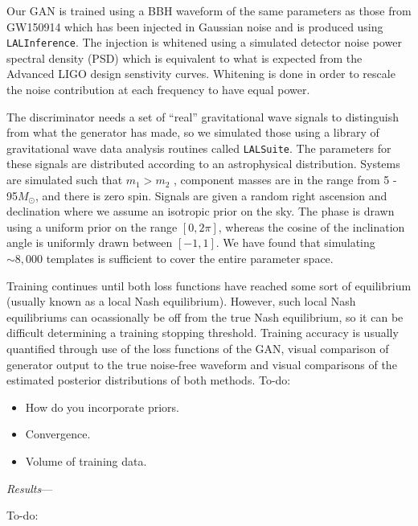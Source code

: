 \documentclass[%
showpacs,
 amsmath,amssymb,
 aps,
 twocolumn,
 prl,
 reprint,
floatfix,
]{revtex4-1}
\begin{document}
Our GAN is trained using a BBH waveform of the same parameters as those from GW150914 which has been injected in Gaussian noise and is produced using \texttt{LALInference}. The injection is whitened using a simulated detector noise power spectral density (PSD) which is equivalent to what is expected from the Advanced LIGO design senstivity curves. Whitening is done in order to rescale the noise contribution at each frequency to have equal power.


The discriminator needs a set of ``real'' gravitational wave signals to distinguish from what the generator has made, so we simulated those using a library of gravitational wave data analysis routines called \texttt{LALSuite}. The parameters for these signals are distributed according to an astrophysical distribution. Systems are simulated such that $m_{1} > m_{2}$ , component masses are in the range from 5 - 95\(M_\odot\), and there is zero spin. Signals are given a random right ascension and declination where we assume an isotropic prior on the sky. The phase is drawn using a uniform prior on the range $[0,2\pi]$, whereas the cosine of the inclination angle is uniformly drawn between $[-1,1]$. We have found that simulating $\sim8,000$ templates is sufficient to cover the entire parameter space. 

Training continues until both loss functions have reached some sort of equilibrium (usually known as a local Nash equilibrium). However, such local Nash equilibriums can ocassionally be off from the true Nash equilibrium, so it can be difficult determining a training stopping threshold. Training accuracy is usually quantified through use of the loss functions of the GAN, visual comparison of generator output to the true noise-free waveform and visual comparisons of the estimated posterior distributions of both methods.
To-do:

\begin{itemize}
\item How do you incorporate priors.
\item Convergence.
\item Volume of training data.
\end{itemize}

\textit{Results}---


To-do:
\end{document}
